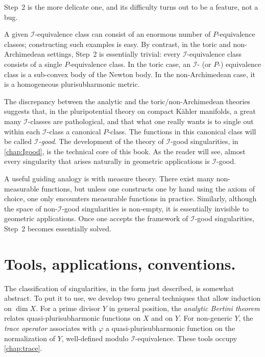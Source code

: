 Step~2 is the more delicate one, and its difficulty turns out to be a feature, not a bug.

A given $\mathcal{I}$-equivalence class can consist of an enormous number of $P$-equivalence classes; constructing such examples is easy. By contrast, in the toric and non-Archimedean settings, Step~2 is essentially trivial: every $\mathcal{I}$-equivalence class consists of a single $P$-equivalence class. In the toric case, an $\mathcal{I}$- (or $P$-) equivalence class is a sub-convex body of the Newton body. In the non-Archimedean case, it is a homogeneous plurisubharmonic metric.

The discrepancy between the analytic and the toric/non-Archimedean theories suggests that, in the pluripotential theory on compact Kähler manifolds, a great many $\mathcal{I}$-classes are pathological, and that what one really wants is to single out within each $\mathcal{I}$-class a canonical $P$-class. The functions in this canonical class will be called \emph{$\mathcal{I}$-good}. The development of the theory of $\mathcal{I}$-good singularities, in \cref{chap:Igood}, is the technical core of this book. As the reader will see, almost every singularity that arises naturally in geometric applications is $\mathcal{I}$-good.

A useful guiding analogy is with measure theory. There exist many non-measurable functions, but unless one constructs one by hand using the axiom of choice, one only encounters measurable functions in practice. Similarly, although the space of non-$\mathcal{I}$-good singularities is non-empty, it is essentially invisible to geometric applications. Once one accepts the framework of $\mathcal{I}$-good singularities, Step~2 becomes essentially solved.

\section*{Tools, applications, conventions.}
The classification of singularities, in the form just described, is somewhat abstract. To put it to use, we develop two general techniques that allow induction on $\dim X$. For a prime divisor $Y$ in general position, the \emph{analytic Bertini theorem} relates quasi-plurisubharmonic functions on $X$ and on $Y$. For non-generic $Y$, the \emph{trace operator} associates with $\varphi$ a quasi-plurisubharmonic function on the normalization of $Y$, well-defined modulo $\mathcal{I}$-equivalence. These tools occupy \cref{chap:trace}.

